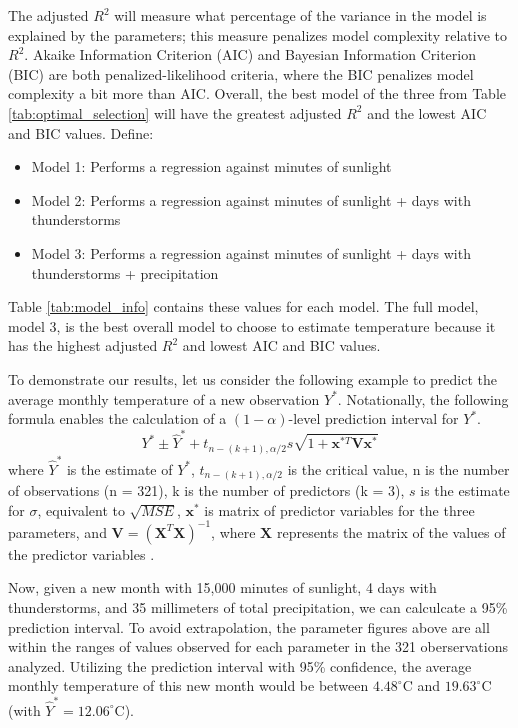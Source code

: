 The adjusted $R^{2}$ will measure what percentage of the variance in the model is explained by the parameters; this measure penalizes model complexity relative to $R^{2}$. Akaike Information Criterion (AIC) and Bayesian Information Criterion (BIC) are both penalized-likelihood criteria, where the BIC penalizes model complexity a bit more than AIC. Overall, the best model of the three from Table \ref{tab:optimal_selection} will have the greatest adjusted $R^{2}$ and the lowest AIC and BIC values. Define: 

\begin{itemize}
	\item Model 1: Performs a regression against minutes of sunlight
	\item Model 2: Performs a regression against minutes of sunlight + days with thunderstorms
	\item Model 3: Performs a regression against minutes of sunlight + days with thunderstorms + precipitation
\end{itemize} 

Table \ref{tab:model_info} contains these values for each model. The full model, model 3, is the best overall model to choose to estimate temperature because it has the highest adjusted $R^{2}$ and lowest AIC and BIC values.

To demonstrate our results, let us consider the following example to predict the average monthly temperature of a new observation $Y^{*}$. Notationally, the following formula enables the calculation of a $(1-\alpha)$-level prediction interval for $Y^{*}$. $$Y^{*} \pm \hat{Y}^{*} + t_{n-(k+1),\alpha/2} s \sqrt{1+\textbf{x}^{*T}\textbf{V}\textbf{x}^{*}}$$ where $\hat{Y}^{*}$ is the estimate of $Y^{*}$, $t_{n-(k+1),\alpha/2}$ is the critical value, n is the number of observations (n = 321), k is the number of predictors (k = 3), $s$ is the estimate for $\sigma$, equivalent to $\sqrt{MSE}$, $\textbf{x}^{*}$ is matrix of predictor variables for the three parameters, and $\textbf{V} = (\textbf{X}^{T}\textbf{X})^{-1}$, where $\textbf{X}$ represents the matrix of the values of the predictor variables \cite{tamhane}.

Now, given a new month with 15,000 minutes of sunlight, 4 days with thunderstorms, and 35 millimeters of total precipitation, we can calculcate a 95\% prediction interval. To avoid extrapolation, the parameter figures above are all within the ranges of values observed for each parameter in the 321 oberservations analyzed. Utilizing the prediction interval with 95\% confidence, the average monthly temperature of this new month would be between $4.48^{\circ}$C and $19.63^{\circ}$C (with $\hat{Y}^{*} = 12.06^{\circ}$C).


